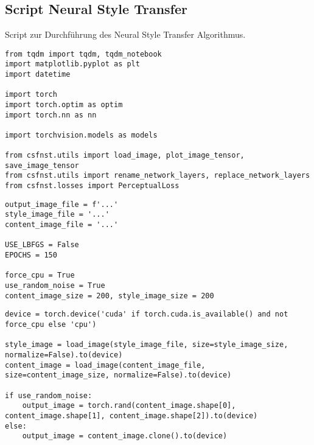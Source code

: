 \appendix
\chapter{}
\section{Script Neural Style Transfer}
\label{sec:script_neural_style_transfer}
Script zur Durchführung des Neural Style Transfer Algorithmus.

\begin{listing}[H]
\begin{verbatim}
from tqdm import tqdm, tqdm_notebook
import matplotlib.pyplot as plt
import datetime

import torch
import torch.optim as optim
import torch.nn as nn

import torchvision.models as models

from csfnst.utils import load_image, plot_image_tensor, save_image_tensor
from csfnst.utils import rename_network_layers, replace_network_layers
from csfnst.losses import PerceptualLoss
\end{verbatim}
\label{lst:neural_style_transfer_1}
\end{listing}

\begin{listing}[H]
\begin{verbatim}
output_image_file = f'...'
style_image_file = '...'
content_image_file = '...'

USE_LBFGS = False
EPOCHS = 150

force_cpu = True
use_random_noise = True
content_image_size = 200, style_image_size = 200
\end{verbatim}
\label{lst:neural_style_transfer_2}
\end{listing}

\begin{listing}[H]
\begin{verbatim}
device = torch.device('cuda' if torch.cuda.is_available() and not force_cpu else 'cpu')

style_image = load_image(style_image_file, size=style_image_size, normalize=False).to(device)
content_image = load_image(content_image_file, size=content_image_size, normalize=False).to(device)

if use_random_noise:
    output_image = torch.rand(content_image.shape[0], content_image.shape[1], content_image.shape[2]).to(device)
else:
    output_image = content_image.clone().to(device)
\end{verbatim}
\label{lst:neural_style_transfer_3}
\end{listing}


